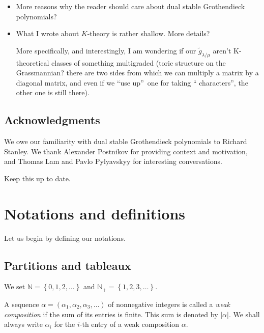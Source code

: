 \documentclass[12pt]{article}
\theoremstyle{plain}
\theoremstyle{definition}
\newenvironment{todo}{}{}
\begin{document}
\begin{todo}
\begin{itemize}
\item More reasons why the reader should
care about dual stable Grothendieck polynomials?

\item What I wrote about $K$-theory is rather shallow. More details?

More specifically, and interestingly, I am wondering if our $\widetilde{g}%
_{\lambda/\mu}$ aren't K-theoretical classes of something multigraded (toric
structure on the Grassmannian? there are two sides from which we can multiply
a matrix by a diagonal matrix, and even if we \textquotedblleft use
up\textquotedblright\ one for taking \textquotedblleft
characters\textquotedblright, the other one is still there).
\end{itemize}
\end{todo}

\subsection{Acknowledgments}

We owe our familiarity with dual stable Grothendieck polynomials to Richard
Stanley. We thank Alexander Postnikov for providing context and motivation,
and Thomas Lam and Pavlo Pylyavskyy for interesting conversations.

\begin{todo}
Keep this up to date.
\end{todo}

\section{\label{sect.notations}Notations and definitions}

Let us begin by defining our notations.

\subsection{Partitions and tableaux}

We set $\mathbb{N}=\left\{  0,1,2,\ldots\right\}  $ and $\mathbb{N}%
_{+}=\left\{  1,2,3,\ldots\right\}  $. 


 A sequence $\alpha=\left(\alpha_{1},\alpha_{2},\alpha_{3},\ldots\right)$ of nonnegative integers is called a \textit{weak composition} if the sum of its entries is finite. This sum is denoted by $\left\vert \alpha\right\vert$.
 We shall always write $\alpha_i$ for the $i$-th entry of a weak composition $\alpha$.
\end{document}
